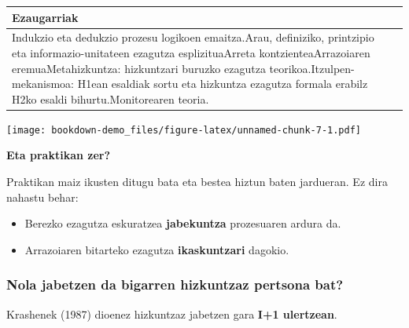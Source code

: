 \documentclass[
]{book}
\providecommand{\tightlist}{%
  \setlength{\itemsep}{0pt}\setlength{\parskip}{0pt}}
\begin{document}
\begin{longtable}[]{@{}lcl@{}}
\toprule
\begin{minipage}[b]{0.81\columnwidth}\raggedright
Ezaugarriak\strut
\end{minipage} & \begin{minipage}[b]{0.05\columnwidth}\centering
\strut
\end{minipage} & \begin{minipage}[b]{0.05\columnwidth}\raggedright
\strut
\end{minipage}\tabularnewline
\midrule
\endhead
\begin{minipage}[t]{0.81\columnwidth}\raggedright
Indukzio eta dedukzio prozesu logikoen emaitza.Arau, definiziko, printzipio eta informazio-unitateen ezagutza esplizituaArreta kontzienteaArrazoiaren eremuaMetahizkuntza: hizkuntzari buruzko ezagutza teorikoa.Itzulpen-mekanismoa: H1ean esaldiak sortu eta hizkuntza ezagutza formala erabilz H2ko esaldi bihurtu.Monitorearen teoria.\strut
\end{minipage} & \begin{minipage}[t]{0.05\columnwidth}\centering
\strut
\end{minipage} & \begin{minipage}[t]{0.05\columnwidth}\raggedright
\strut
\end{minipage}\tabularnewline
\bottomrule
\end{longtable}

\texttt{[image: bookdown-demo\_files/figure-latex/unnamed-chunk-7-1.pdf]}

\textbf{Eta praktikan zer?}

Praktikan maiz ikusten ditugu bata eta bestea hiztun baten jardueran. Ez dira nahastu behar:

\begin{itemize}
\tightlist
\item
  Berezko ezagutza eskuratzea \textbf{jabekuntza} prozesuaren ardura da.
\item
  Arrazoiaren bitarteko ezagutza \textbf{ikaskuntzari} dagokio.
\end{itemize}

\hypertarget{nola-jabetzen-da-bigarren-hizkuntzaz-pertsona-bat}{%
\subsubsection{Nola jabetzen da bigarren hizkuntzaz pertsona bat?}\label{nola-jabetzen-da-bigarren-hizkuntzaz-pertsona-bat}}

Krashenek (1987) dioenez hizkuntzaz jabetzen gara \textbf{I+1 ulertzean}.
\end{document}

